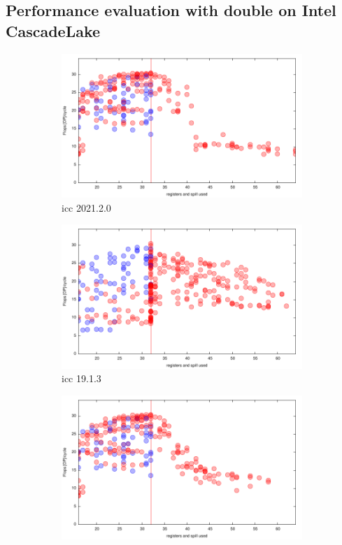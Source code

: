 \documentclass[sigconf,review]{acmart}
\begin{document}
\subsection{Performance evaluation with double on Intel CascadeLake}
\begin{figure}[ht]
  \begin{subfigure}[h]{0.45\textwidth}
  \includegraphics[width=\textwidth]{../benches/gemm/cascadelake-64x256x64/icc-2021.2.0.pdf}
  \caption{icc 2021.2.0}
  \end{subfigure}
  \begin{subfigure}[h]{0.45\textwidth}  
\includegraphics[width=\textwidth]{../benches/gemm/cascadelake-64x256x64/icc-19.1.3.pdf}
  \caption{icc 19.1.3}
  \end{subfigure}
  \begin{subfigure}[h]{0.45\textwidth}  
\includegraphics[width=\textwidth]{../benches/gemm/cascadelake-64x256x64/pbqp.pdf}

\end{subfigure}
\end{figure}
\end{document}
